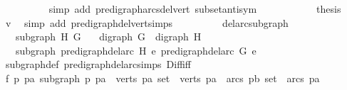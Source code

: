 \begin{isabellebody}
\ \ \ \ \ \ \ \ \isamarkupfalse%
\ {\isacharparenleft}{\kern0pt}simp\ add{\isacharcolon}{\kern0pt}\ pre{\isacharunderscore}{\kern0pt}digraph{\isachardot}{\kern0pt}arcs{\isacharunderscore}{\kern0pt}del{\isacharunderscore}{\kern0pt}vert\ subset{\isacharunderscore}{\kern0pt}antisym{\isacharparenright}{\kern0pt}\isanewline
\ \ \ \ \ \ \ \ \isamarkupfalse%
\ \isamarkupfalse%
\ {\isacharquery}{\kern0pt}thesis\ \isamarkupfalse%
\ v\ \isamarkupfalse%
\ {\isacharparenleft}{\kern0pt}simp\ add{\isacharcolon}{\kern0pt}\ pre{\isacharunderscore}{\kern0pt}digraph{\isachardot}{\kern0pt}del{\isacharunderscore}{\kern0pt}vert{\isacharunderscore}{\kern0pt}simps{\isacharparenright}{\kern0pt}\isanewline
\ \ \ \ \ \ \isamarkupfalse%
%
\endisatagproof
{\isafoldproof}%
%
\isadelimproof
\ \isanewline
%
\endisadelimproof
\isanewline
{}\isamarkupfalse%
\ del{\isacharunderscore}{\kern0pt}arc{\isacharunderscore}{\kern0pt}subgraph{\isacharcolon}{\kern0pt}\isanewline
\ \ \ {\isachardoublequoteopen}subgraph\ H\ G{\isachardoublequoteclose}\isanewline
\ \ \ {\isachardoublequoteopen}digraph\ G\ {\isasymand}\ digraph\ H{\isachardoublequoteclose}\isanewline
\ \ \ {\isachardoublequoteopen}subgraph\ {\isacharparenleft}{\kern0pt}pre{\isacharunderscore}{\kern0pt}digraph{\isachardot}{\kern0pt}del{\isacharunderscore}{\kern0pt}arc\ H\ e{}{\isacharparenright}{\kern0pt}\ {\isacharparenleft}{\kern0pt}pre{\isacharunderscore}{\kern0pt}digraph{\isachardot}{\kern0pt}del{\isacharunderscore}{\kern0pt}arc\ G\ e{}{\isacharparenright}{\kern0pt}{\isachardoublequoteclose}\isanewline
%
\isadelimproof
\ \ %
\endisadelimproof
%
\isatagproof
{}\isamarkupfalse%
\ subgraph{\isacharunderscore}{\kern0pt}def\ pre{\isacharunderscore}{\kern0pt}digraph{\isachardot}{\kern0pt}del{\isacharunderscore}{\kern0pt}arc{\isacharunderscore}{\kern0pt}simps\ Diff{\isacharunderscore}{\kern0pt}iff\isanewline
{}\isamarkupfalse%
\ {\isacharminus}{\kern0pt}\isanewline
\ \ \isamarkupfalse%
\ f{}{\isacharcolon}{\kern0pt}\ {\isachardoublequoteopen}{\isasymforall}p\ pa{\isachardot}{\kern0pt}\ subgraph\ p\ pa\ {\isacharequal}{\kern0pt}\ {\isacharparenleft}{\kern0pt}{\isacharparenleft}{\kern0pt}verts\ p{\isacharcolon}{\kern0pt}{\isacharcolon}{\kern0pt}{\isacharprime}{\kern0pt}a\ set{\isacharparenright}{\kern0pt}\ {\isasymsubseteq}\ verts\ pa\ {\isasymand}\ {\isacharparenleft}{\kern0pt}arcs\ p{\isacharcolon}{\kern0pt}{\isacharcolon}{\kern0pt}{\isacharprime}{\kern0pt}b\ set{\isacharparenright}{\kern0pt}\ {\isasymsubseteq}\ arcs\ pa\ {\isasymand}\ \isanewline

\end{isabellebody}
